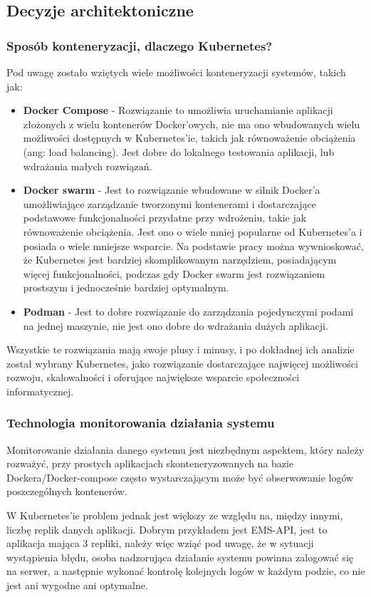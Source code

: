 \subsection{Decyzje architektoniczne}
\subsubsection{Sposób konteneryzacji, dlaczego Kubernetes?}

Pod uwagę zostało wziętych wiele możliwości konteneryzacji systemów, takich jak:
\begin{itemize}
    \item \textbf{Docker Compose} - Rozwiązanie to umożliwia uruchamianie aplikacji złożonych z wielu kontenerów Docker'owych, nie ma ono wbudowanych wielu możliwości dostępnych w Kubernetes'ie, takich jak równoważenie obciążenia (ang: load balancing). Jest dobre do lokalnego testowania aplikacji, lub wdrażania małych rozwiązań.
    \item \textbf{Docker swarm} - Jest to rozwiązanie wbudowane w silnik Docker'a umożliwiające zarządzanie tworzonymi kontenerami i dostarczające podstawowe funkcjonalności przydatne przy wdrożeniu, takie jak równoważenie obciążenia. Jest ono o wiele mniej popularne od Kubernetes'a i posiada o wiele mniejsze wsparcie. Na podstawie pracy \cite{KubernetesVSDockerSwarm} można wywnioskować, że Kubernetes jest bardziej skomplikowanym narzędziem, posiadającym więcej funkcjonalności, podczas gdy Docker swarm jest rozwiązaniem prostszym i jednocześnie bardziej optymalnym.
    \item \textbf{Podman} - Jest to dobre rozwiązanie do zarządzania pojedynczymi podami na jednej maszynie, nie jest ono dobre do wdrażania dużych aplikacji.
\end{itemize}
Wszystkie te rozwiązania mają swoje plusy i minusy, i po dokładnej ich analizie został wybrany Kubernetes, jako rozwiązanie dostarczające najwięcej możliwości rozwoju, skalowalności i oferujące największe wsparcie społeczności informatycznej.
\subsubsection{Technologia monitorowania działania systemu}
Monitorowanie działania danego systemu jest niezbędnym aspektem, który należy rozważyć, przy prostych aplikacjach skonteneryzowanych na bazie Dockera/Docker-compose często wystarczającym może być obserwowanie logów poszczególnych kontenerów. 

W Kubernetes'ie problem jednak jest większy ze względu na, między innymi, liczbę replik danych aplikacji. Dobrym przykładem jest EMS-API, jest to aplikacja mająca 3 repliki, należy więc wziąć pod uwagę, że w sytuacji wystąpienia błędu, osoba nadzorująca działanie systemu powinna zalogować się na serwer, a następnie wykonać kontrolę  kolejnych logów w każdym podzie, co nie jest ani wygodne ani optymalne.

